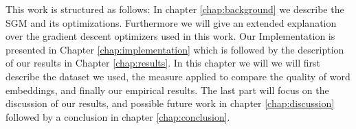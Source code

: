 This work is structured as follows: In chapter \ref{chap:background} we describe the SGM and its optimizations. Furthermore we will give an extended explanation over the gradient descent optimizers used in this work. Our Implementation is presented in Chapter \ref{chap:implementation} which is followed by the description of our results in Chapter \ref{chap:results}. In this chapter we will we will first describe the dataset we used, the measure applied to compare the quality of word embeddings, and finally our empirical results. The last part will focus on the discussion of our results, and possible future work in chapter \ref{chap:discussion} followed by a conclusion in chapter \ref{chap:conclusion}.














